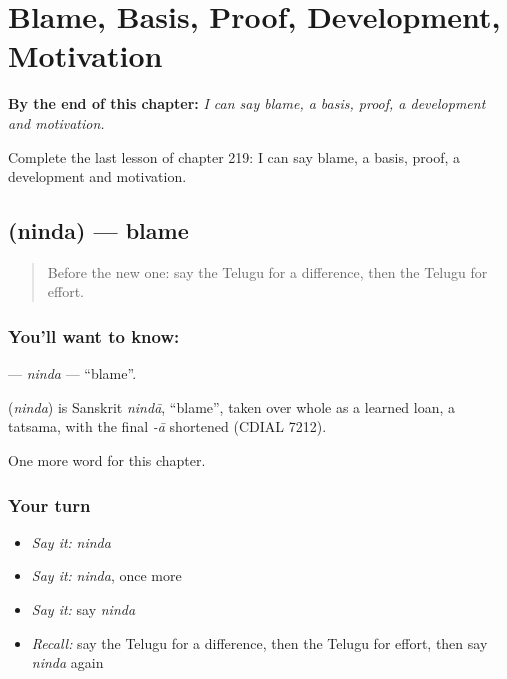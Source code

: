
\chapter{Blame, Basis, Proof, Development, Motivation}
\label{ch:te-blame-basis-proof-development-motivation}

\begin{chapteropening}
\textbf{By the end of this chapter:} \emph{I can say blame, a basis, proof, a development and motivation.}

Complete the last lesson of chapter 219: I can say blame, a basis, proof, a development and motivation.
\end{chapteropening}

\section[\texorpdfstring{\te{నింద} (ninda)}{నింద (ninda)}]{ (ninda) — blame}

\label{lesson:TE-C219-ninda}



\begin{quote}
Before the new one: say the Telugu for a difference, then the Telugu for effort.
\end{quote}

\subsection*{You'll want to know: }
\textbf{} — \emph{ninda} — \textquotedblleft{}blame\textquotedblright{}.

\begin{cousinweb}
\textbf{} (\emph{ninda}) is Sanskrit \emph{nindā}, \textquotedblleft{}blame\textquotedblright{}, taken over whole as a learned loan, a tatsama, with the final \emph{-ā} shortened (CDIAL 7212).
\end{cousinweb}

\begin{grammarlens}[title={What you've built}]
One more word for this chapter.
\end{grammarlens}

\subsection*{Your turn}
\begin{itemize}
\raggedright
  \item \emph{Say it:} \emph{ninda}
  \item \emph{Say it:} \emph{ninda}, once more
  \item \emph{Say it:} say \emph{ninda}
  \item \emph{Recall:} say the Telugu for a difference, then the Telugu for effort, then say \emph{ninda} again
\end{itemize}

